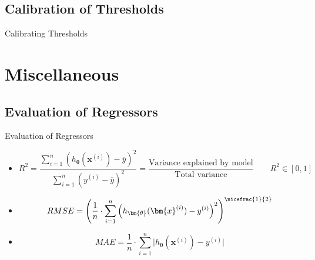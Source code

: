 \subsection{Calibration of Thresholds}

\begin{frame}{Calibrating Thresholds}{}
\end{frame}


\section{Miscellaneous}

\subsection{Evaluation of Regressors}

\begin{frame}{Evaluation of Regressors}{}
	\vspace*{2mm}
	\begin{itemize}
		\item {}
		\scriptsize
		\begin{equation}
			R^2 	= \frac{\sum_{i=1}^n (h_{\bm{\theta}}(\bm{x}^{(i)}) - \overline{y})^2}{\sum_{i=1}^n (y^{(i)} - \overline{y})^2}
					= \frac{\text{Variance explained by model}}{\text{Total variance}} \qquad R^2 \in [0,1]
		\end{equation}
		\normalsize
		\item {}
		\scriptsize
		\begin{equation}
			RMSE = \left( \frac{1}{n} \cdot \sum_{i=1}^n \left( h_{\bm{\theta}}(\bm{x}^{(i)}) - y^{(i)} \right)^2 \right)^{\nicefrac{1}{2}}
		\end{equation}
		\normalsize
		\item {}
		\scriptsize
		\begin{equation}
			MAE = \frac{1}{n} \cdot \sum_{i=1}^n \vert h_{\bm{\theta}}(\bm{x}^{(i)}) - y^{(i)} \vert
		\end{equation}
	\end{itemize}
\end{frame}


